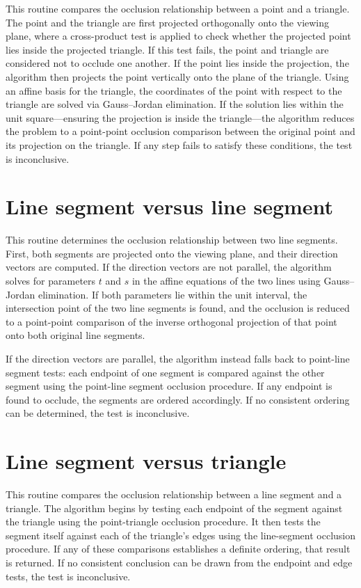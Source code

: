 This routine compares the occlusion relationship between a point and 
a triangle. The point and the triangle are first projected orthogonally 
onto the viewing plane, where a cross-product test is applied to check 
whether the projected point lies inside the projected triangle. If this 
test fails, the point and triangle are considered not to occlude one 
another. If the point lies inside the projection, the algorithm then 
projects the point vertically onto the plane of the triangle. Using an 
affine basis for the triangle, the coordinates of the point 
with respect to the triangle are solved via Gauss--Jordan elimination. 
If the solution lies within the unit square---ensuring the 
projection is inside the triangle---the algorithm reduces the problem 
to a point-point 
occlusion comparison between the original point and its projection on the 
triangle. If any step fails to satisfy these conditions, the test is 
inconclusive.

\section{Line segment versus line segment}

This routine determines the occlusion relationship between two line 
segments. First, both segments are projected onto the viewing plane, 
and their direction vectors are computed. If the direction vectors are 
not parallel, the algorithm solves for parameters \(t\) and \(s\) in 
the affine equations of the two lines using Gauss--Jordan elimination. 
If both parameters lie within the unit interval, the intersection point 
of the two line segments is found, and the occlusion is reduced to a 
point-point comparison of the inverse orthogonal projection of that 
point onto both original line segments.

If the direction vectors are parallel, the algorithm instead falls back 
to point-line segment tests: each endpoint of one segment is compared 
against the 
other segment using the point-line segment occlusion procedure. If any 
endpoint 
is found to occlude, the segments are ordered accordingly. If no 
consistent ordering can be determined, the test is inconclusive.

\section{Line segment versus triangle}

This routine compares the occlusion relationship between a line segment 
and a triangle. The algorithm begins by testing each endpoint of the 
segment against the triangle using the point-triangle occlusion 
procedure. It then tests the segment itself against each of the 
triangle's edges using the line-segment occlusion procedure. If any of 
these comparisons establishes a definite ordering, that result is 
returned. If no consistent conclusion can be 
drawn from the endpoint and edge tests, the test is
inconclusive.

